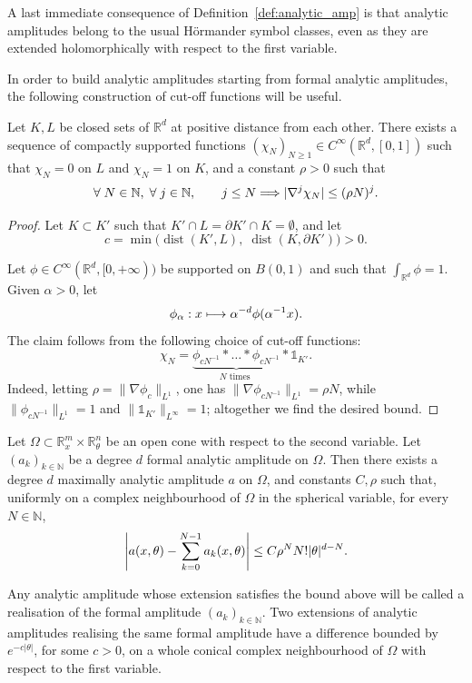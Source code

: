 \documentclass[AHL,Unicode,longabstracts,published]{cedram}
\DeclareMathOperator{\dist}{dist}
\newcommand\1{\mathds{1}}
\newcommand{\R}{\mathbb{R}}
\newcommand{\N}{\mathbb{N}}
\let\oldforall\forall
\renewcommand*{\forall}{\mathrel{\oldforall}}
\let\oldmapsto\mapsto
\renewcommand*{\mapsto}{\mathchoice{\longmapsto}{\oldmapsto}{\oldmapsto}{\oldmapsto}}
\renewcommand*{\implies}{\mathchoice{\Longrightarrow}{\Rightarrow}{\Rightarrow}{\Rightarrow}}
\let\originalleft\left
\let\originalright\right
\renewcommand{\left}{\mathopen{}\mathclose\bgroup\originalleft}
\renewcommand{\right}{\aftergroup\egroup\originalright}
\begin{document}
A last immediate consequence of Definition~\ref{def:analytic_amp} is that analytic amplitudes belong to the usual H\"ormander symbol classes, even as they are extended holomorphically with respect to the first variable.


In order to build analytic amplitudes starting from formal analytic amplitudes, the following construction of cut-off functions will be useful.

\begin{prop}
\label{prop:Ehrenpreis}
Let $K,L$ be closed sets of $\R^d$ at positive distance from each other. There exists a sequence of compactly supported functions $(\chi_N)_{N\geq 1}\in C^{\infty}(\R^d,[0,1])$ such that $\chi_N=0$ on $L$ and $\chi_N=1$ on $K$, and a constant $\rho>0$ such that
\begin{equation}\label{eq:Ehrenpreis}
\forall N\in \N,\; \forall j\in \N,\qquad j\leq N\implies |\nabla^j\chi_N|\leq (\rho N)^j.
\end{equation}
\end{prop}
\begin{proof}
Let $K\subset K'$ such that $K'\cap L=\partial K'\cap K=\emptyset $, and let
\[
c=\min\bigl(\dist(K',L),\;\dist(K,\partial K')\bigr)>0.
\]

Let $\phi\in C^{\infty}(\R^d,[0,+\infty))$ be supported on $B(0,1)$ and such that $\int_{\R^d}\phi=1$. Given $\alpha>0$, let
\[
\phi_{\alpha}:x\mapsto \alpha^{-d}\phi(\alpha^{-1}x).
\]
The claim follows from the following choice of cut-off functions:
\[
\chi_N=\underbrace{\phi_{cN^{-1}}*\dots *\phi_{cN^{-1}}}_{N\text{ times }}*\1_{K'}.
\]
Indeed, letting $\rho=\|\nabla \phi_c\|_{L^1}$, one has $\|\nabla
\phi_{cN^{-1}}\|_{L^1}=\rho N$, while $\|\phi_{cN^{-1}}\|_{L^1}=1$ and $\|\1_{K'}\|_{L^{\infty}}=1$; altogether we find the desired bound.
\end{proof}


\begin{prop}\label{prop:real_formal_symb}
Let $\Omega\subset \R^m_x\times \R^n_{\theta}$ be an open cone with respect to the second variable. Let $(a_k)_{k\in \N}$ be a degree $d$ formal analytic amplitude on $\Omega$. Then there exists a degree $d$ maximally analytic amplitude $a$ on $\Omega$, and constants $C,\rho$ such that, uniformly on a complex neighbourhood of $\Omega$ in the spherical variable, for every $N\in \N$,
\[
\left|a(x,\theta)-\sum_{k=0}^{N-1}a_k(x,\theta)\right|\leq C\rho^NN!|\theta|^{d-N}.
\]

Any analytic amplitude whose extension satisfies the bound above will be called a realisation of the formal amplitude $(a_k)_{k\in
\N}$. Two extensions of analytic amplitudes realising the same formal amplitude have a difference bounded by $e^{-c|\theta|}$, for some $c>0$, on a whole conical complex neighbourhood of $\Omega$ with respect to the first variable.
\end{prop}
\end{document}
